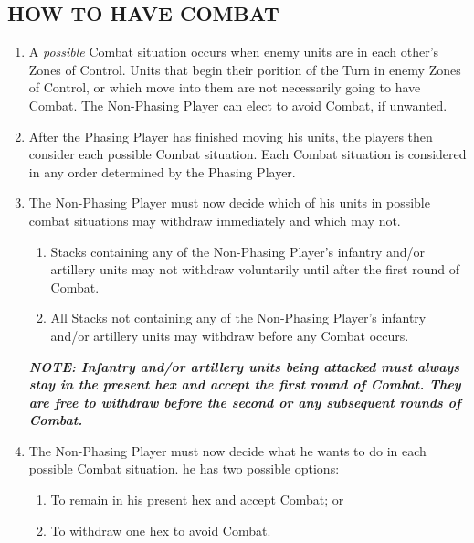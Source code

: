 \subsection{HOW TO HAVE COMBAT}

\begin{enumerate}
  \item A \textit{possible} Combat situation occurs when enemy units are in each other's Zones of Control. Units that begin their porition of the Turn in enemy Zones of Control, or which move into them are not necessarily going to have Combat. The Non-Phasing Player can elect to avoid Combat, if unwanted.

  \item After the Phasing Player has finished moving his units, the players then consider each possible Combat situation. Each Combat situation is considered in any order determined by the Phasing Player.

  \item The Non-Phasing Player must now decide which of his units in possible combat situations may withdraw immediately and which may not.

  \begin{enumerate}[label=\alph*)]
    \item Stacks containing any of the Non-Phasing Player's infantry and/or artillery units may not withdraw voluntarily until after the first round of Combat.

    \item All Stacks not containing any of the Non-Phasing Player's infantry and/or artillery units may withdraw before any Combat occurs.
  \end{enumerate}

  \textbf{\textit{NOTE: Infantry and/or artillery units being attacked must always stay in the present hex and accept the first round of Combat. They are free to withdraw before the second or any subsequent rounds of Combat.}}

  \item The Non-Phasing Player must now decide what he wants to do in each possible Combat situation. he has two possible options:

  \begin{enumerate}[label=\alph*)]
    \item To remain in his present hex and accept Combat; or
    \item To withdraw one hex to avoid Combat.
  \end{enumerate}


\end{enumerate}
